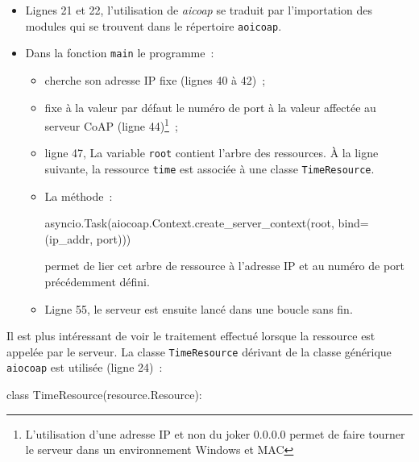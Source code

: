 
\begin{itemize}
    \item Lignes 21 et 22, l’utilisation de \textit{aicoap} se traduit par l’importation des modules qui se trouvent dans le répertoire \texttt{aoicoap}. 
    \item Dans la fonction \texttt{main} le programme~:
    \begin{itemize}
        \item cherche son adresse IP fixe (lignes 40 à 42)~;
        \item  fixe à la valeur par défaut le numéro de port à la valeur affectée au serveur CoAP (ligne 44)\footnote{L’utilisation d’une adresse IP et non du joker 0.0.0.0 permet de faire tourner le serveur dans un environnement Windows et MAC}~;
        \item ligne 47, La variable \texttt{root} contient l’arbre des ressources. À la ligne suivante, la ressource \texttt{time} est associée à une classe \texttt{TimeResource}.
        \item La méthode~:

\begin{termc}[backgroundcolor=\color{palerod}, basicstyle=\ttfamily\tiny, escapechar=@] 
asyncio.Task(aiocoap.Context.create_server_context(root, bind=(ip_addr, port)))
\end{termc}

        permet de lier cet arbre de ressource à l’adresse IP et au numéro de port précédemment défini.
        
        \item Ligne 55, le serveur est ensuite lancé dans une boucle sans fin.
    \end{itemize}

\end{itemize}

         \vspace{1em}


Il est plus intéressant de voir le traitement effectué lorsque la ressource est appelée par le serveur. La classe \texttt{TimeResource} dérivant de la classe générique \texttt{aiocoap}  est utilisée (ligne 24)~:

\begin{termc}[backgroundcolor=\color{palerod}, basicstyle=\ttfamily\small, escapechar=@] 
class TimeResource(resource.Resource):
\end{termc}

